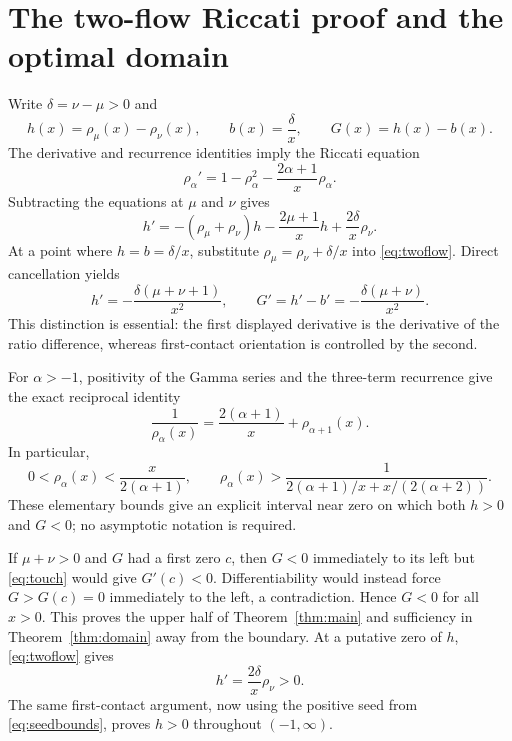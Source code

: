 \documentclass[11pt]{article}
\theoremstyle{remark}
\begin{document}
\section{The two-flow Riccati proof and the optimal domain}
\label{sec:proof}

Write $\delta=\nu-\mu>0$ and
\[
 h(x)=\rho_\mu(x)-\rho_\nu(x),\qquad b(x)=\frac{\delta}{x},
 \qquad G(x)=h(x)-b(x).
\]
The derivative and recurrence identities imply the Riccati equation
\begin{equation}
\label{eq:riccati}
 \rho_\alpha'=1-\rho_\alpha^2-\frac{2\alpha+1}{x}\rho_\alpha.
\end{equation}
Subtracting the equations at $\mu$ and $\nu$ gives
\begin{equation}
\label{eq:twoflow}
 h'=-(\rho_\mu+\rho_\nu)h-\frac{2\mu+1}{x}h
       +\frac{2\delta}{x}\rho_\nu.
\end{equation}
At a point where $h=b=\delta/x$, substitute
$\rho_\mu=\rho_\nu+\delta/x$ into \eqref{eq:twoflow}.  Direct
cancellation yields
\begin{equation}
\label{eq:touch}
 h'=-\frac{\delta(\mu+\nu+1)}{x^2},\qquad
 G'=h'-b'=-\frac{\delta(\mu+\nu)}{x^2}.
\end{equation}
This distinction is essential: the first displayed derivative is the
derivative of the ratio difference, whereas first-contact orientation
is controlled by the second.

For $\alpha>-1$, positivity of the Gamma series and the three-term
recurrence give the exact reciprocal identity
\begin{equation}
\label{eq:reciprocal}
 \frac1{\rho_\alpha(x)}=\frac{2(\alpha+1)}x+\rho_{\alpha+1}(x).
\end{equation}
In particular,
\begin{equation}
\label{eq:seedbounds}
 0<\rho_\alpha(x)<\frac{x}{2(\alpha+1)},\qquad
 \rho_\alpha(x)>
 \frac1{2(\alpha+1)/x+x/(2(\alpha+2))}.
\end{equation}
These elementary bounds give an explicit interval near zero on which
both $h>0$ and $G<0$; no asymptotic notation is required.

If $\mu+\nu>0$ and $G$ had a first zero $c$, then $G<0$
immediately to its left but \eqref{eq:touch} would give $G'(c)<0$.
Differentiability would instead force $G>G(c)=0$ immediately to the
left, a contradiction.  Hence $G<0$ for all $x>0$.  This proves the
upper half of Theorem~\ref{thm:main} and sufficiency in
Theorem~\ref{thm:domain} away from the boundary.  At a putative zero
of $h$, \eqref{eq:twoflow} gives
\[
 h'=\frac{2\delta}{x}\rho_\nu>0.
\]
The same first-contact argument, now using the positive seed from
\eqref{eq:seedbounds}, proves $h>0$ throughout $(-1,\infty)$.
\end{document}
